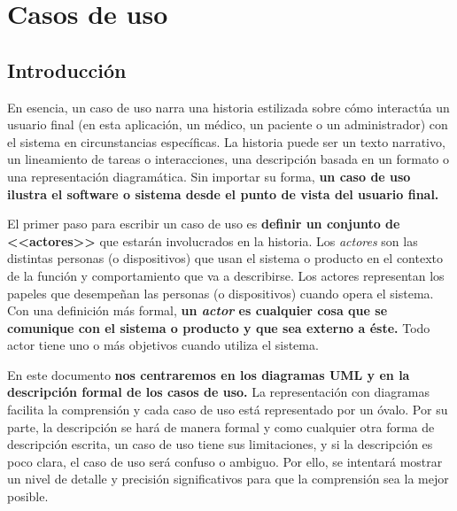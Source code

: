 \documentclass[a4paper,oneside,11pt]{book}
\begin{document}
	
\chapter{Casos de uso} %
	\label{cha:casos_de_uso}

% 
%
\section{Introducción} %
	\label{sec:modelo_casos_de_uso}
	
		En esencia, un caso de uso narra una historia estilizada sobre cómo interactúa un usuario final (en esta aplicación, un médico, un paciente o un administrador) con el sistema en circunstancias específicas. La historia puede ser un texto narrativo, un lineamiento de tareas o interacciones, una descripción basada en un formato o una representación diagramática. Sin importar su forma, \textbf{un caso de uso ilustra el software o sistema desde el punto de vista del usuario final.}
		
		\medskip
		
		\medskip		
		El primer paso para escribir un caso de uso es \textbf{definir un conjunto de <<actores>>} que estarán involucrados en la historia. Los \textit{actores} son las distintas personas (o dispositivos) que usan el sistema o producto en el contexto de la función y comportamiento que va a describirse. Los actores representan los papeles que desempeñan las personas (o dispositivos) cuando opera el sistema. Con una definición más formal, \textbf{un \textit{actor} es cualquier cosa que se comunique con el sistema o producto y que sea externo a éste.} Todo actor tiene uno o más objetivos cuando utiliza el sistema.
		
		 En este documento \textbf{nos centraremos en los diagramas UML y en la descripción formal de los casos de uso.} La representación con diagramas facilita la comprensión y cada caso de uso está representado por un óvalo. Por su parte, la descripción se hará de manera formal y como cualquier otra forma de descripción escrita, un caso de uso tiene sus limitaciones, y si la descripción es poco clara, el caso de uso será confuso o ambiguo. Por ello, se intentará mostrar un nivel de detalle y precisión significativos para que la comprensión sea la mejor posible.
		
\end{document}
